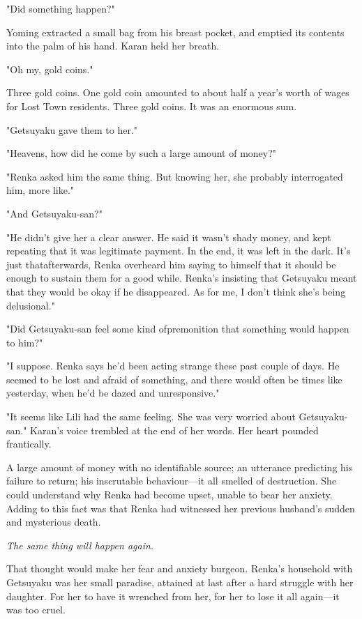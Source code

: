 "Did something happen?"

Yoming extracted a small bag from his breast pocket, and emptied its
contents into the palm of his hand. Karan held her breath.

"Oh my, gold coins."

Three gold coins. One gold coin amounted to about half a year's worth of
wages for Lost Town residents. Three gold coins. It was an enormous sum.

"Getsuyaku gave them to her."

"Heavens, how did he come by such a large amount of money?"

"Renka asked him the same thing. But knowing her, she probably
interrogated him, more like."

"And Getsuyaku-san?"

"He didn't give her a clear answer. He said it wasn't shady money, and
kept repeating that it was legitimate payment. In the end, it was left
in the dark. It's just that\el afterwards, Renka overheard him saying to
himself that it should be enough to sustain them for a good while.
Renka's insisting that Getsuyaku meant that they would be okay if he
disappeared. As for me, I don't think she's being delusional."

"Did Getsuyaku-san feel some kind of\el premonition that something would
happen to him?"

"I suppose. Renka says he'd been acting strange these past couple of
days. He seemed to be lost and afraid of something, and there would
often be times like yesterday, when he'd be dazed and unresponsive."

"It seems like Lili had the same feeling. She was very worried about
Getsuyaku-san." Karan's voice trembled at the end of her words. Her
heart pounded frantically.

A large amount of money with no identifiable source; an utterance
predicting his failure to return; his inscrutable behaviour---it all
smelled of destruction. She could understand why Renka had become upset,
unable to bear her anxiety. Adding to this fact was that Renka had
witnessed her previous husband's sudden and mysterious death.

\emph{The same thing will happen again.}

That thought would make her fear and anxiety burgeon. Renka's household
with Getsuyaku was her small paradise, attained at last after a hard
struggle with her daughter. For her to have it wrenched from her, for
her to lose it all again---it was too cruel.

